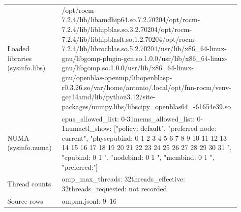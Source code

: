 \begin{longtable}{>{\raggedright\arraybackslash}p{0.23\linewidth}>{\raggedright\arraybackslash}p{0.71\linewidth}}
Loaded libraries (sysinfo.libs) & /\allowbreak{}opt/\allowbreak{}rocm-7.2.4/\allowbreak{}lib/\allowbreak{}libamdhip64.so.7.2.70204\newline /\allowbreak{}opt/\allowbreak{}rocm-7.2.4/\allowbreak{}lib/\allowbreak{}libhipblas.so.3.2.70204\newline /\allowbreak{}opt/\allowbreak{}rocm-7.2.4/\allowbreak{}lib/\allowbreak{}libhipblaslt.so.1.2.70204\newline /\allowbreak{}opt/\allowbreak{}rocm-7.2.4/\allowbreak{}lib/\allowbreak{}librocblas.so.5.2.70204\newline /\allowbreak{}usr/\allowbreak{}lib/\allowbreak{}x86\_\allowbreak{}64-linux-gnu/\allowbreak{}libgomp-plugin-gcn.so.1.0.0\newline /\allowbreak{}usr/\allowbreak{}lib/\allowbreak{}x86\_\allowbreak{}64-linux-gnu/\allowbreak{}libgomp.so.1.0.0\newline /\allowbreak{}usr/\allowbreak{}lib/\allowbreak{}x86\_\allowbreak{}64-linux-gnu/\allowbreak{}openblas-openmp/\allowbreak{}libopenblasp-r0.3.26.so\newline /\allowbreak{}var/\allowbreak{}home/\allowbreak{}antonio/\allowbreak{}.local/\allowbreak{}opt/\allowbreak{}fnn-rocm/\allowbreak{}venv-gcc14amd/\allowbreak{}lib/\allowbreak{}python3.12/\allowbreak{}site-packages/\allowbreak{}numpy.libs/\allowbreak{}libscipy\_\allowbreak{}openblas64\_\allowbreak{}-61654e39.so \\
NUMA (sysinfo.numa) & cpus\_\allowbreak{}allowed\_\allowbreak{}list: 0-31\newline mems\_\allowbreak{}allowed\_\allowbreak{}list: 0-1\newline numactl\_\allowbreak{}show: ["policy: default", "preferred node: current", "physcpubind: 0 1 2 3 4 5 6 7 8 9 10 11 12 13 14 15 16 17 18 19 20 21 22 23 24 25 26 27 28 29 30 31 ", "cpubind: 0 1 ", "nodebind: 0 1 ", "membind: 0 1 ", "preferred:"] \\
Thread counts & omp\_\allowbreak{}max\_\allowbreak{}threads: 32\newline threads\_\allowbreak{}effective: 32\newline threads\_\allowbreak{}requested: not recorded \\
Source rows & ompnn.jsonl: 9–16 \\
\end{longtable}
